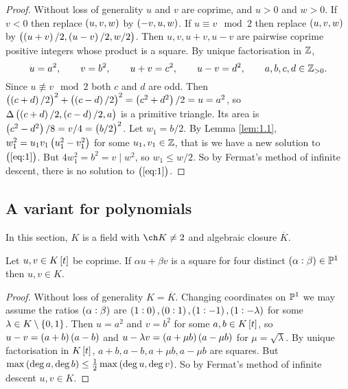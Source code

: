 \begin{proof}
Without loss of generality $ u $ and $ v $ are coprime, and $ u > 0 $ and $ w > 0 $. If $ v < 0 $ then replace $ \br{u, v, w} $ by $ \br{-v, u, w} $. If $ u \equiv v \mod 2 $ then replace $ \br{u, v, w} $ by $ \br{\br{u + v} / 2, \br{u - v} / 2, w / 2} $. Then $ u, v, u + v, u - v $ are pairwise coprime positive integers whose product is a square. By unique factorisation in $ \mathbb{Z} $,
$$ u = a^2, \qquad v = b^2, \qquad u + v = c^2, \qquad u - v = d^2, \qquad a, b, c, d \in \mathbb{Z}_{> 0}. $$
Since $ u \not\equiv v \mod 2 $ both $ c $ and $ d $ are odd. Then $ \br{\br{c + d} / 2}^2 + \br{\br{c - d} / 2}^2 = \br{c^2 + d^2} / 2 = u = a^2 $, so $ \Delta\br{\br{c + d} / 2, \br{c - d} / 2, a} $ is a primitive triangle. Its area is $ \br{c^2 - d^2} / 8 = v / 4 = \br{b / 2}^2 $. Let $ w_1 = b / 2 $. By Lemma \ref{lem:1.1}, $ w_1^2 = u_1v_1\br{u_1^2 - v_1^2} $ for some $ u_1, v_1 \in \mathbb{Z} $, that is we have a new solution to $ \br{\ref{eq:1}} $. But $ 4w_1^2 = b^2 = v \mid w^2 $, so $ w_1 \le w / 2 $. So by Fermat's method of infinite descent, there is no solution to $ \br{\ref{eq:1}} $.
\end{proof}

\pagebreak

\subsection{A variant for polynomials}

In this section, $ K $ is a field with $ \ch K \ne 2 $ and algebraic closure $ \overline{K} $.

\begin{lemma}
\label{lem:1.4}
Let $ u, v \in K\sbr{t} $ be coprime. If $ \alpha u + \beta v $ is a square for four distinct $ \br{\alpha : \beta} \in \PP^1 $ then $ u, v \in K $.
\end{lemma}

\begin{proof}
Without loss of generality $ K = \overline{K} $. Changing coordinates on $ \mathbb{P}^1 $ we may assume the ratios $ \br{\alpha : \beta} $ are $ \br{1 : 0}, \br{0 : 1}, \br{1 : -1}, \br{1 : -\lambda} $ for some $ \lambda \in K \setminus \cbr{0, 1} $. Then $ u = a^2 $ and $ v = b^2 $ for some $ a, b \in K\sbr{t} $, so $ u - v = \br{a + b}\br{a - b} $ and $ u - \lambda v = \br{a + \mu b}\br{a - \mu b} $ for $ \mu = \sqrt{\lambda} $. By unique factorisation in $ K\sbr{t} $, $ a + b, a - b, a + \mu b, a - \mu b $ are squares. But $ \max\br{\deg a, \deg b} \le \tfrac{1}{2}\max\br{\deg u, \deg v} $. So by Fermat's method of infinite descent $ u, v \in K $.
\end{proof}

